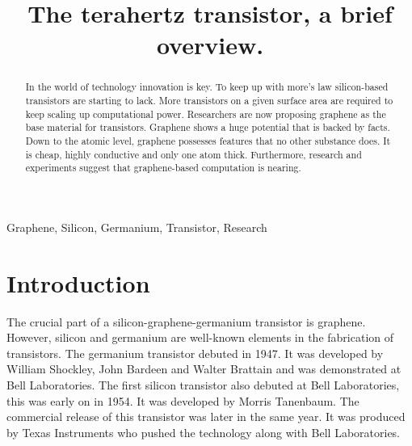 \documentclass[conference, 10pt]{IEEEtran}
\begin{document}
\title{The terahertz transistor, a brief overview.}

\author{
}

\maketitle
\thispagestyle{plain}

\begin{abstract}
In the world of technology innovation is key. To keep up with more's law silicon-based transistors are starting to lack. More transistors on a given surface area are required to keep scaling up computational power. Researchers are now proposing graphene as the base material for transistors.  Graphene shows a huge potential that is backed by facts. Down to the atomic level, graphene possesses features that no other substance does. It is cheap, highly conductive and only one atom thick. Furthermore, research and experiments suggest that graphene-based computation is nearing.\\
\end{abstract}

\begin{IEEEkeywords}
Graphene, Silicon, Germanium, Transistor, Research
\end{IEEEkeywords}

\maketitle

\section{Introduction}

The crucial part of a silicon-graphene-germanium transistor is graphene. However, silicon and germanium are well-known elements in the fabrication of transistors. The germanium transistor debuted in 1947. It was developed by William Shockley, John Bardeen and Walter Brattain and was demonstrated at Bell Laboratories. The first silicon transistor also debuted at Bell Laboratories, this was early on in 1954. It was developed by Morris Tanenbaum. The commercial release of this transistor was later in the same year. It was produced by Texas Instruments who pushed the technology along with Bell Laboratories. \cite{phys} \cite{germaniumhistory} \cite{transistorhistory} \cite{losthistory}\\
\end{document}

